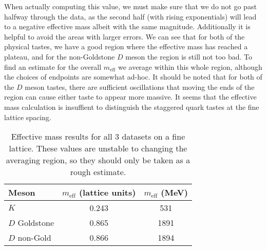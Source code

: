 \documentclass[a4paper,12pt]{article}
\begin{document}
When actually computing this value, we must make sure that we do not go past halfway through the data, as the second half (with rising exponentials) will lead to a negative effective mass albeit with the same magnitude. Additionally it is helpful to avoid the areas with larger errors. We can see that for both of the physical tastes, we have a good region where the effective mass has reached a plateau, and for the non-Goldstone $D$ meson the region is still not too bad. To find an estimate for the overall $m_\mathrm{eff}$ we average within this whole region, although the choices of endpoints are somewhat ad-hoc. It should be noted that for both of the $D$ meson tastes, there are sufficient oscillations that moving the ends of the region can cause either taste to appear more massive. It seems that the effective mass calculation is insuffient to distinguish the staggered quark tastes at the fine lattice spacing.

\begin{figure}[!h]
\end{figure}

\begin{table}
\centering
\begin{tabular}{l S[table-format=1.2] S[table-format=4]}
    Meson               & {$m_\mathrm{eff}$ (lattice units)}    & {$m_\mathrm{eff}$ (\si{MeV})} \\
    \midrule
    $K$                 & 0.243                 & 531\\
    $D$ Goldstone       & 0.865                 & 1891\\
    $D$ non-Gold        & 0.866                 & 1894
\end{tabular}
\caption{Effective mass results for all 3 datasets on a fine lattice. These values are unstable to changing the averaging region, so they should only be taken as a rough estimate.}
\end{table}
\end{document}
